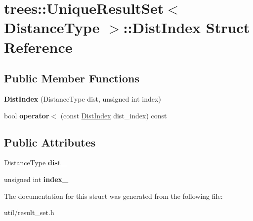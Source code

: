 \hypertarget{structtrees_1_1_unique_result_set_1_1_dist_index}{}\section{trees\+:\+:Unique\+Result\+Set$<$ Distance\+Type $>$\+:\+:Dist\+Index Struct Reference}
\label{structtrees_1_1_unique_result_set_1_1_dist_index}
\subsection*{Public Member Functions}
\begin{DoxyCompactItemize}
\item 
\mbox{\label{structtrees_1_1_unique_result_set_1_1_dist_index_aac8345219321567db4a9ccd0da7ed827}} 
{\bfseries Dist\+Index} (Distance\+Type dist, unsigned int index)
\item 
\mbox{\label{structtrees_1_1_unique_result_set_1_1_dist_index_abf0c04fdea75664003b96a0f8735c017}} 
bool {\bfseries operator$<$} (const \hyperlink{structtrees_1_1_unique_result_set_1_1_dist_index}{Dist\+Index} dist\+\_\+index) const
\end{DoxyCompactItemize}
\subsection*{Public Attributes}
\begin{DoxyCompactItemize}
\item 
\mbox{\label{structtrees_1_1_unique_result_set_1_1_dist_index_aa382acdc4be772e9788f1d77a1cfa247}} 
Distance\+Type {\bfseries dist\+\_\+}
\item 
\mbox{\label{structtrees_1_1_unique_result_set_1_1_dist_index_a2ad613379c6478910c675a86e9aac5cd}} 
unsigned int {\bfseries index\+\_\+}
\end{DoxyCompactItemize}


The documentation for this struct was generated from the following file\+:\begin{DoxyCompactItemize}
\item 
util/result\+\_\+set.\+h\end{DoxyCompactItemize}
